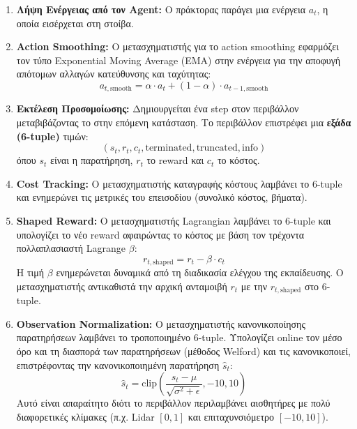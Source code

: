 \documentclass[acmsmall,screen,nonacm]{acmart}
\begin{document}
	\begin{enumerate}
		\item \textbf{Λήψη Ενέργειας από τον Agent:} Ο πράκτορας παράγει μια ενέργεια $a_t$, η οποία εισέρχεται στη στοίβα.
		\item \textbf{Action Smoothing:} Ο μετασχηματιστής για το action smoothing εφαρμόζει τον τύπο Exponential Moving Average (EMA) στην ενέργεια για την αποφυγή απότομων αλλαγών κατεύθυνσης και ταχύτητας:
		\begin{equation}
			a_{t,\text{smooth}} = \alpha \cdot a_t + (1 - \alpha) \cdot a_{t-1,\text{smooth}}
		\end{equation}
		\item \textbf{Εκτέλεση Προσομοίωσης:} Δημιουργείται ένα step στον περιβάλλον μεταβιβάζοντας το στην επόμενη κατάσταση. Το περιβάλλον επιστρέφει μια \textbf{εξάδα (6-tuple)} τιμών: 
		\begin{equation}
			(s_t, r_t, c_t, \text{terminated}, \text{truncated}, \text{info})
		\end{equation}
		όπου $s_t$ είναι η παρατήρηση, $r_t$ το reward και $c_t$ το κόστος.
		\item \textbf{Cost Tracking:} Ο μετασχηματιστής καταγραφής κόστους λαμβάνει το 6-tuple και ενημερώνει τις μετρικές του επεισοδίου (συνολικό κόστος, βήματα).
		\item \textbf{Shaped Reward:} Ο μετασχηματιστής Lagrangian λαμβάνει το 6-tuple και υπολογίζει το νέο reward αφαιρώντας το κόστος με βάση τον τρέχοντα πολλαπλασιαστή Lagrange $\beta$:
		\begin{equation}
			r_{t,\text{shaped}} = r_t - \beta \cdot c_t
		\end{equation}
		Η τιμή $\beta$ ενημερώνεται δυναμικά από τη διαδικασία ελέγχου της εκπαίδευσης. Ο μετασχηματιστής αντικαθιστά την αρχική ανταμοιβή $r_t$ με την $r_{t,\text{shaped}}$ στο 6-tuple.
		\item \textbf{Observation Normalization:} Ο μετασχηματιστής κανονικοποίησης παρατηρήσεων λαμβάνει το τροποποιημένο 6-tuple. Υπολογίζει online τον μέσο όρο και τη διασπορά των παρατηρήσεων (μέθοδος Welford) και τις κανονικοποιεί, επιστρέφοντας την κανονικοποιημένη παρατήρηση $\hat{s}_t$:
		\begin{equation}
			\hat{s}_t = \text{clip}\left(\frac{s_t - \mu}{\sqrt{\sigma^2 + \epsilon}}, -10, 10\right)
		\end{equation}
		Αυτό είναι απαραίτητο διότι το περιβάλλον περιλαμβάνει αισθητήρες με πολύ διαφορετικές κλίμακες (π.χ. Lidar $[0, 1]$ και επιταχυνσιόμετρο $[-10, 10]$).

\end{enumerate}
\end{document}
